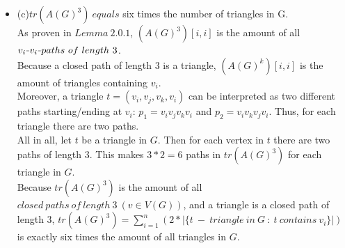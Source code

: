 \documentclass[a4paper]{article}
\newcommand{\unaryminus}{\scalebox{0.5}[1.0]{\( - \)}}
\begin{document}
\begin{solution}{31}
\begin{itemize}
			\item (c)$tr(A(G)^3) ~equals$ six times the number of triangles in G.\\
				As proven in $Lemma ~ 2.0.1$, $(A(G)^3)[i,i]$ is the amount of all $v_i\unaryminus v_i \unaryminus paths ~of ~length ~3$.\\
				Because a closed path of length $3$ is a triangle, $(A(G)^k)[i,i]$ is the amount of triangles containing $v_i$.\\
				Moreover, a triangle $t=(v_i,v_j,v_k,v_i)$ can be interpreted as two different paths starting/ending at $v_i$: $p_1=v_iv_jv_kv_i$ and $p_2=v_iv_kv_jv_i$. Thus, for each triangle there are two paths.\\
				All in all, let $t$ be a triangle in $G$. Then for each vertex in $t$ there are two paths of length $3$.
				This makes $3 * 2 = 6$ paths in $tr(A(G)^3)$ for each triangle in $G$.\\
				Because $tr(A(G)^3)$ is the amount of all $closed~ paths ~ of ~ length~ 3 ~ (v\in V(G))$, and a triangle is a closed path of length $3$, $tr(A(G)^3)=\sum_{i=1}^{n}(2 * |\{t~ -~ triangle ~in~ G ~:~ t~ contains ~v_i\}|)$ is exactly six times the amount of all triangles in $G$.
		\end{itemize}
	\end{solution}
	\newpage
\end{document}
